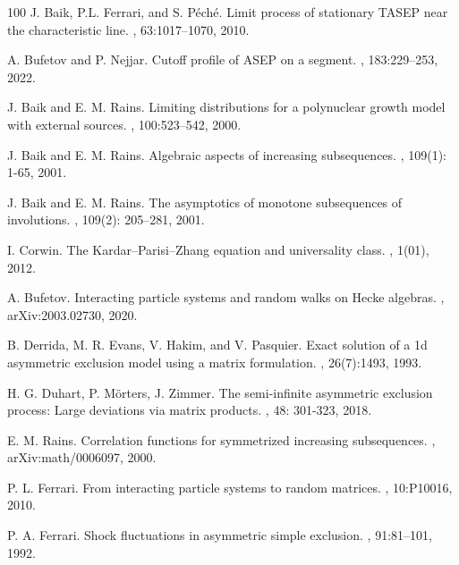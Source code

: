 \documentclass[12pt,a4paper]{amsart}
\theoremstyle{remark}
\numberwithin{equation}{section} \numberwithin{theorem}{section}
\begin{document}
\begin{thebibliography}{100}
J. Baik, P.L. Ferrari, and S. Péché.
\newblock Limit process of stationary TASEP near the characteristic line.
,  63:1017–1070, 2010.

A. Bufetov and P. Nejjar. 
\newblock Cutoff profile of ASEP on a segment.
, 183:229–253, 2022.

J. Baik and E. M. Rains.
\newblock Limiting distributions for a polynuclear growth model with external sources.
,  100:523–542, 2000.

J. Baik and E. M. Rains.
\newblock  Algebraic aspects of increasing subsequences.
,  109(1): 1-65, 2001.

J. Baik and E. M. Rains.
\newblock  The asymptotics of monotone subsequences of involutions.
,  109(2): 205–281, 2001.

I. Corwin.
\newblock The Kardar–Parisi–Zhang equation and universality class.
,  1(01), 2012.

A. Bufetov. 
\newblock Interacting particle systems and random walks on Hecke algebras.
, arXiv:2003.02730, 2020.

B. Derrida, M. R. Evans, V. Hakim, and V. Pasquier. 
\newblock  Exact solution of a 1d asymmetric exclusion model using a matrix formulation.
,  26(7):1493, 1993.

H. G. Duhart, P. Mörters, J. Zimmer.
\newblock  The semi-infinite asymmetric exclusion process: Large deviations via matrix products.
, 48: 301-323, 2018.

E. M. Rains.
\newblock Correlation functions for symmetrized increasing subsequences.
, arXiv:math/0006097, 2000.

P. L. Ferrari.
\newblock  From interacting particle systems to random matrices.
, 10:P10016, 2010.

P. A. Ferrari.
\newblock  Shock fluctuations in asymmetric simple exclusion. 
, 91:81–101, 1992.


\end{thebibliography}
\end{document}
